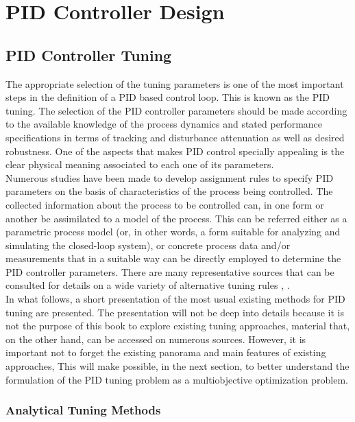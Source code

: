 \chapter{PID Controller Design}

\section{PID Controller Tuning}
The appropriate selection of the tuning parameters is one of the most important steps in the definition of a PID based control loop. This is known as the PID tuning. The selection of the PID controller parameters should be made according to the available knowledge of the process dynamics and stated performance specifications in terms of tracking and disturbance attenuation as well as desired robustness. One of the aspects that makes PID control specially appealing is the clear physical meaning associated to each one of its parameters. \\

Numerous studies have been made to develop assignment rules to specify PID parameters on the basis of characteristics of the process being controlled. The collected information about the process to be controlled can, in one form or another be assimilated to a model of the process. This can be referred either as a parametric process model (or, in other words, a form suitable for analyzing and simulating the closed-loop system), or concrete process data and/or measurements that in a suitable way can be directly employed to determine the PID controller parameters. There are many representative sources that can be consulted for details on a wide variety of alternative tuning rules  \cite{odwyer2006}, \cite{VilanovaBook2012}. \\

In what follows, a short presentation of the most usual existing methods for PID tuning are presented. The presentation will not be deep into details because it is not the purpose of this book to explore existing tuning approaches, material that, on the other hand, can be accessed on numerous sources.  However, it is important not to forget the existing panorama and main features of existing approaches, This will make possible, in the next section, to better understand the formulation of the PID tuning problem as a multiobjective optimization problem.

\subsection{Analytical Tuning Methods}

